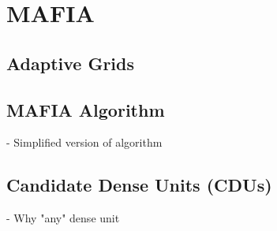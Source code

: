 \section{MAFIA}
\subsection{Adaptive Grids}

\subsection{MAFIA Algorithm}
- Simplified version of algorithm

\subsection{Candidate Dense Units (CDUs)}
- Why "any" dense unit
